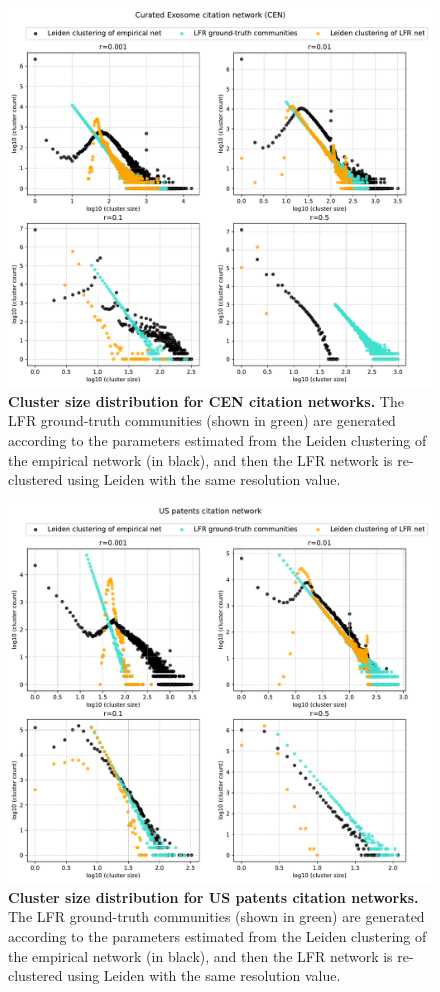 \documentclass[a4paper]{article}   	%
\begin{document}
\begin{figure}[H]
\centering
\includegraphics[width=0.85\linewidth]{figs/cen_cm_size.pdf}
\caption[Cluster size distribution for CEN citation networks.]{\textbf{Cluster size distribution for CEN citation networks.} The LFR ground-truth communities (shown in green) are generated according to the parameters estimated from the Leiden clustering of the empirical network (in black), and then the LFR network is re-clustered using Leiden with the same resolution value. }
\label{fig:cen_cm_size}
\end{figure}

\begin{figure}[H]
\centering
\includegraphics[width=0.85\linewidth]{figs/cit_patents_cm_size.pdf}
\caption[Cluster size distribution for US patents citation networks.]{\textbf{Cluster size distribution for US patents citation networks.} The LFR ground-truth communities (shown in green) are generated according to the parameters estimated from the Leiden clustering of the empirical network (in black), and then the LFR network is re-clustered using Leiden with the same resolution value. }
\label{fig:cit_patents_cm_size}
\end{figure}
\end{document}
